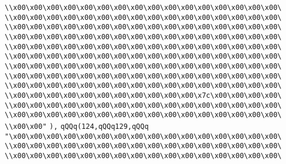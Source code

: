 \verb|\\x00\x00\x00\x00\x00\x00\x00\x00\x00\x00\x00\x00\x00\x00\x00\x00\|\newline
\verb|\\x00\x00\x00\x00\x00\x00\x00\x00\x00\x00\x00\x00\x00\x00\x00\x00\|\newline
\verb|\\x00\x00\x00\x00\x00\x00\x00\x00\x00\x00\x00\x00\x00\x00\x00\x00\|\newline
\verb|\\x00\x00\x00\x00\x00\x00\x00\x00\x00\x00\x00\x00\x00\x00\x00\x00\|\newline
\verb|\\x00\x00\x00\x00\x00\x00\x00\x00\x00\x00\x00\x00\x00\x00\x00\x00\|\newline
\verb|\\x00\x00\x00\x00\x00\x00\x00\x00\x00\x00\x00\x00\x00\x00\x00\x00\|\newline
\verb|\\x00\x00\x00\x00\x00\x00\x00\x00\x00\x00\x00\x00\x00\x00\x00\x00\|\newline
\verb|\\x00\x00\x00\x00\x00\x00\x00\x00\x00\x00\x00\x00\x00\x00\x00\x00\|\newline
\verb|\\x00\x00\x00\x00\x00\x00\x00\x00\x00\x00\x00\x00\x00\x00\x00\x00\|\newline
\verb|\\x00\x00\x00\x00\x00\x00\x00\x00\x00\x00\x00\x7c\x00\x00\x00\x00\|\newline
\verb|\\x00\x00\x00\x00\x00\x00\x00\x00\x00\x00\x00\x00\x00\x00\x00\x00\|\newline
\verb|\\x00\x00\x00\x00\x00\x00\x00\x00\x00\x00\x00\x00\x00\x00\x00\x00\|\newline
\verb|\\x00\x00"|\newline
\verb|),|\newline
\verb|qQQq(124,qQQq129,qQQq|\newline
\verb|"\x00\x00\x00\x00\x00\x00\x00\x00\x00\x00\x00\x00\x00\x00\x00\x00\|\newline
\verb|\\x00\x00\x00\x00\x00\x00\x00\x00\x00\x00\x00\x00\x00\x00\x00\x00\|\newline
\verb|\\x00\x00\x00\x00\x00\x00\x00\x00\x00\x00\x00\x00\x00\x00\x00\x00\|\newline
